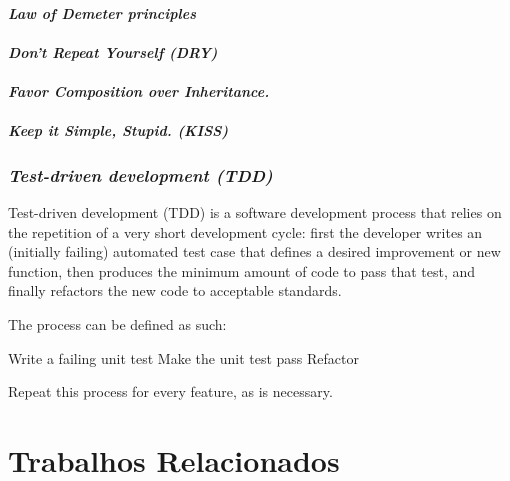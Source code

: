\documentclass[12pt]{article}
\begin{document}
\subsection{\textit{Law of Demeter principles}} \label{sec:law_of_demeter}
\subsection{\textit{Don't Repeat Yourself (DRY)}} \label{sec:law_of_demeter}
\subsection{\textit{Favor Composition over Inheritance.}} \label{sec:law_of_demeter}
\subsection{\textit{Keep it Simple, Stupid. (KISS)}} \label{sec:law_of_demeter}



\section{\textsl{Test-driven development (TDD)}} \label{sec:tdd}
Test-driven development (TDD) is a software development process that relies on the repetition of a very short development cycle: first the developer writes an (initially failing) automated test case that defines a desired improvement or new function, then produces the minimum amount of code to pass that test, and finally refactors the new code to acceptable standards.

The process can be defined as such:

    Write a failing unit test
    Make the unit test pass
    Refactor

Repeat this process for every feature, as is necessary.

\part{Trabalhos Relacionados} \label{sec:trabalhosrelacionados}



\end{document}
